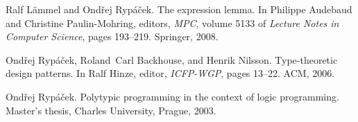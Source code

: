 \documentclass[a4paper]{article}
\begin{document}
\begin{thebibliography}{RBN06}
Ralf L{\"a}mmel and Ond\v{r}ej Ryp\'a\v{c}ek.
\newblock The expression lemma.
\newblock In Philippe Audebaud and Christine Paulin-Mohring, editors, {\em
  MPC}, volume 5133 of {\em Lecture Notes in Computer Science}, pages 193--219.
  Springer, 2008.

Ond\v{r}ej Ryp\'a\v{c}ek, Roland~Carl Backhouse, and Henrik Nilsson.
\newblock Type-theoretic design patterns.
\newblock In Ralf Hinze, editor, {\em ICFP-WGP}, pages 13--22. ACM, 2006.



Ond\v{r}ej Ryp\'a\v{c}ek.
\newblock Polytypic programming in the context of logic programming.
\newblock Master's thesis, Charles University, Prague, 2003.


\end{thebibliography}

\end{document}
